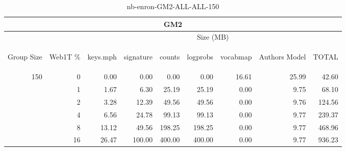 \begin{center}
\begin{table}[htbp] 
 \begin{center}
\begin{tabular}{ | r | r | r | r | r | r | r | r | r |}
\hline
\multicolumn{9}{|c|}{GM2}\\
\hline
 & & \multicolumn{7}{|c|}{Size (MB)}\\ \cline{3-9}
\begin{sideways}Group Size\end{sideways} & \begin{sideways}Web1T \% \end{sideways} & \begin{sideways}keys.mph\end{sideways} & \begin{sideways}signature\end{sideways} & \begin{sideways}counts\end{sideways} & \begin{sideways}logprobs\end{sideways} & \begin{sideways}vocabmap\end{sideways} & \begin{sideways}Authors Model \end{sideways} & \begin{sideways}TOTAL\end{sideways}\\
\hline
\multirow{5}{*}{150}
 & 0 & 0.00 & 0.00 & 0.00 & 0.00 & 16.61 & 25.99 & 42.60\\ \cline{2-9}
 & 1 & 1.67 & 6.30 & 25.19 & 25.19 & 0.00 & 9.75 & 68.10\\ \cline{2-9}
 & 2 & 3.28 & 12.39 & 49.56 & 49.56 & 0.00 & 9.76 & 124.56\\ \cline{2-9}
 & 4 & 6.56 & 24.78 & 99.13 & 99.13 & 0.00 & 9.77 & 239.37\\ \cline{2-9}
 & 8 & 13.12 & 49.56 & 198.25 & 198.25 & 0.00 & 9.77 & 468.96\\ \cline{2-9}
 & 16 & 26.47 & 100.00 & 400.00 & 400.00 & 0.00 & 9.77 & 936.23\\ \cline{2-9}
\hline
\end{tabular}
\caption{nb-enron-GM2-ALL-ALL-150}
\label{table:nb-enron-GM2-ALL-ALL-150}
\end{center}
 \end{table}
\end{center}

